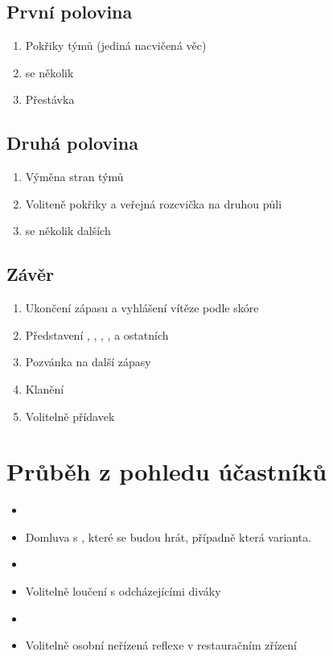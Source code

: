 \documentclass[main.tex]{subfiles}
\begin{document}
\subsection{ První polovina } \begin{enumerate}
\item  Pokřiky týmů (jediná nacvičená věc)
\item  {}  se několik 
\item  Přestávka
\end{enumerate}
 
\subsection{ Druhá polovina } \begin{enumerate}
\item  Výměna stran týmů
\item  Voliteně pokřiky a veřejná rozcvička na druhou půli
\item  {} se několik dalších 
\end{enumerate}
 
\subsection{ Závěr } \begin{enumerate}
\item  Ukončení zápasu a vyhlášení vítěze podle skóre
\item  Představení , , , ,  a ostatních
\item  Pozvánka na další zápasy
\item  Klanění
\item  Volitelně přídavek
\end{enumerate}
 
\section{ Průběh z pohledu účastníků } \begin{itemize}
\item  {}
\item  Domluva s , které  se budou hrát, případně která varianta.
\item  {}
\item  Volitelně loučení s odcházejícími diváky
\item  {}
\item  Volitelně osobní neřízená reflexe v restauračním zřízení
\end{itemize}
 
\end{document}
